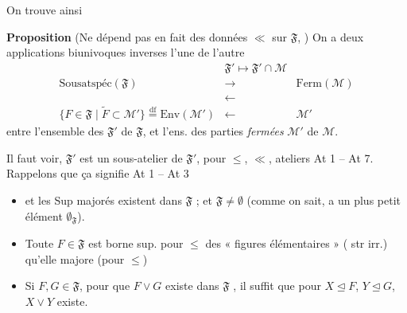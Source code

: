\documentclass[11pt,a4paper]{article}
\begin{document}
 On trouve ainsi

\textbf{Proposition} (Ne dépend pas en fait des données $\ll$ sur $\mathfrak{F}$, ) On a deux applications \struck{\ill{}} biunivoques inverses l'une de l'autre
\[
  \begin{array}{ccc}
    & \mathfrak{F}' \longmapsto \mathfrak{F}' \cap \mathcal{M} & \\
    \text{Sousatspéc}(\mathfrak{F}) & \longrightarrow & \mathrm{Ferm}(\mathcal{M}) \\
    & \longleftarrow & \\
    \lbrace F \in \mathfrak{F} \mid \widetilde{F} \subset \mathcal{M}' \rbrace \overset{\mathrm{df}}{=} \mathrm{Env}(\mathcal{M}') & \longleftarrow & \mathcal{M}'
  \end{array}
\]
entre l'ensemble des    $\mathfrak{F}'$ de $\mathfrak{F}$, et l'ens. des parties \emph{fermées} $\mathcal{M}'$ de $\mathcal{M}$.


Il faut voir, \struck{\ill{}}  $\mathfrak{F}'$ est un sous-atelier de $\mathfrak{F}'$,  pour $\leq$, $\ll$,   ateliers At 1 -- At 7. Rappelons que ça signifie At 1 -- At 3
\begin{itemize}
  \item[At 1] \struck{\ill{}} et les Sup majorés  existent dans $\mathfrak{F}$ ; et $\mathfrak{F} \neq \emptyset$ (comme on sait, a un plus petit élément $\emptyset_{\mathfrak{F}}$).
  \item[At 2] Toute  $F \in \mathfrak{F}$ est borne sup. pour $\leq$ des « figures élémentaires » (\ill{} str irr.) qu'elle majore (pour $\leq$)
  \item[At 3] Si $F, G \in \mathfrak{F}$, pour que $F \vee G$ existe dans $\mathfrak{F}$ , il suffit que \struck{\ill{}} pour $X \trianglelefteq F$, $Y \trianglelefteq G$, $X \vee Y$ existe.
\end{itemize}
\end{document}
